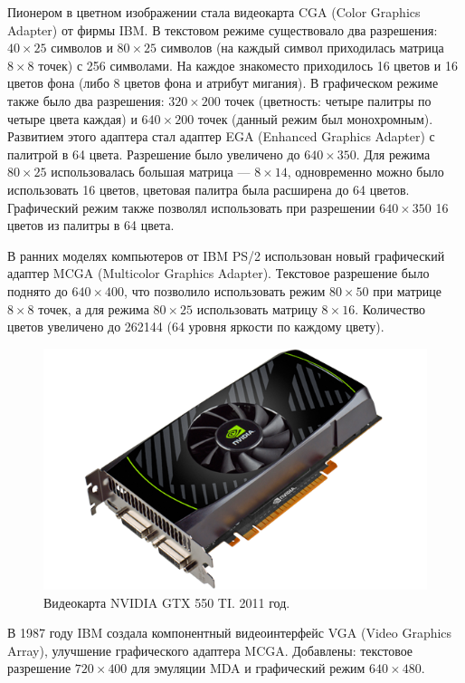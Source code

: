 Пионером в цветном изображении стала видеокарта CGA (Color Graphics Adapter) от фирмы IBM. В текстовом режиме существовало два разрешения: $40 \times 25$ символов и $80 \times 25$ символов (на каждый символ приходилась матрица $8 \times 8$ точек) с 256 символами. На каждое знакоместо приходилось 16 цветов и 16 цветов фона (либо 8 цветов фона и атрибут мигания). В графическом режиме также было два разрешения: $320 \times 200$ точек (цветность: четыре палитры по четыре цвета каждая) и $640 \times 200$ точек (данный режим был монохромным). Развитием этого адаптера стал адаптер EGA (Enhanced Graphics Adapter) с палитрой в 64 цвета. Разрешение было увеличено до $640 \times 350$. Для режима $80 \times 25$ использовалась большая матрица --- $8 \times 14$, одновременно можно было использовать 16 цветов, цветовая палитра была расширена до 64 цветов. Графический режим также позволял использовать при разрешении $640 \times 350$ 16 цветов из палитры в 64 цвета.

В ранних моделях компьютеров от IBM PS/2 использован новый графический адаптер MCGA (Multicolor Graphics Adapter). Текстовое разрешение было поднято до $640 \times 400$, что позволило использовать режим $80 \times 50$ при матрице $8 \times 8$ точек, а для режима $80 \times 25$ использовать матрицу $8 \times 16$. Количество цветов увеличено до 262144 (64 уровня яркости по каждому цвету).

\begin{figure}
\includegraphics[width=\linewidth]{img/gtx_550_ti.png}
\caption{Видеокарта NVIDIA GTX 550 TI. 2011 год.}
\end{figure}

В 1987 году IBM создала компонентный видеоинтерфейс VGA (Video Graphics Array), улучшение графического адаптера MCGA. Добавлены: текстовое разрешение $720 \times 400$ для эмуляции MDA и графический режим $640 \times 480$.

